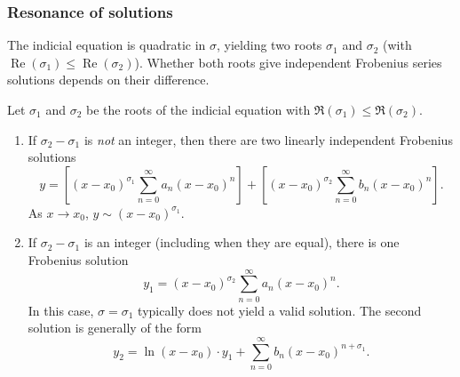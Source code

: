 \documentclass[a4paper]{article}
\begin{document}
\subsubsection{Resonance of solutions}
\begin{remark}
  The indicial equation is quadratic in $\sigma$, yielding two roots $\sigma_1$ and $\sigma_2$ (with $\operatorname{Re}(\sigma_1) \leq \operatorname{Re}(\sigma_2)$). Whether both roots give independent Frobenius series solutions depends on their difference.
\end{remark}

\begin{prop}
  Let $\sigma_1$ and $\sigma_2$ be the roots of the indicial equation with $\Re(\sigma_1) \leq \Re(\sigma_2)$.
  \begin{enumerate}
    \item If $\sigma_2 - \sigma_1$ is \emph{not} an integer, then there are two linearly independent Frobenius solutions
      \[
        y = \left[(x - x_0)^{\sigma_1}\sum_{n = 0}^{\infty} a_n(x - x_0)^n\right] + \left[(x - x_0)^{\sigma_2}\sum_{n = 0}^{\infty} b_n(x - x_0)^n\right].
      \]
      As $x\to x_0$, $y \sim (x - x_0)^{\sigma_1}$.

    \item If $\sigma_2 - \sigma_1$ is an integer (including when they are equal), there is one Frobenius solution
      \[
        y_1 = (x - x_0)^{\sigma_2}\sum_{n = 0}^{\infty} a_n(x - x_0)^n.
      \]
      In this case, $\sigma = \sigma_1$ typically does not yield a valid solution. The second solution is generally of the form
      \[
        y_2 = \ln(x - x_0)\cdot y_1 + \sum_{n = 0}^\infty b_n(x - x_0)^{n + \sigma_1}.
      \]
  \end{enumerate}
\end{prop}
\end{document}
